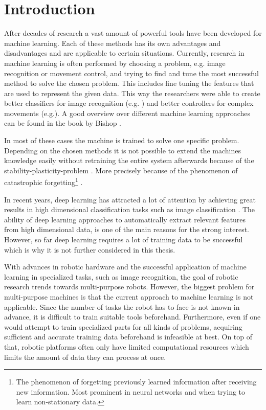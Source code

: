 \chapter{Introduction}


After decades of research a vast amount of powerful tools have been developed for machine learning. Each of these methods has its own advantages and disadvantages and are applicable to certain situations. Currently, research in machine learning is often performed by choosing a problem, e.g. image recognition or movement control, and trying to find and tune the most successful method to solve the chosen problem. This includes fine tuning the features that are used to represent the given data. This way the researchers were able to create better classifiers for image recognition (e.g. \cite{imageRecList}) and better controllers for complex movements (e.g.\cite{movementList}). A good overview over different machine learning approaches can be found in the book by Bishop \cite{bishop2006pattern}.

In most of these cases the machine is trained to solve one specific problem. Depending on the chosen methods it is not possible to extend the machines knowledge easily without retraining the entire system afterwards because of the stability-plasticity-problem \cite{stability-plasticity}. More precisely because of the phenomenon of catastrophic forgetting\footnote{The phenomenon of forgetting previously learned information after receiving new information. Most prominent in neural networks and when trying to learn non-stationary data.} \cite{catastrophicForgetting1}.

In recent years, deep learning \cite{deepLearning2009,deepFrontier} has attracted a lot of attention by achieving great results in high dimensional classification tasks such as image classification \cite{deepImageClassification}. The ability of deep learning approaches to automatically extract relevant features from high dimensional data, is one of the main reasons for the strong interest. However, so far deep learning requires a lot of training data to be successful which is why it is not further considered in this thesis.

With advances in robotic hardware and the successful application of machine learning in specialized tasks, such as image recognition, the goal of robotic research trends towards multi-purpose robots. However, the biggest problem for multi-purpose machines is that the current approach to machine learning is not applicable. Since the number of tasks the robot has to face is not known in advance, it is difficult to train suitable tools beforehand. Furthermore, even if one would attempt to train specialized parts for all kinds of problems, acquiring sufficient and accurate training data beforehand is infeasible at best. On top of that, robotic platforms often only have limited computational resources which limits the amount of data they can process at once.

